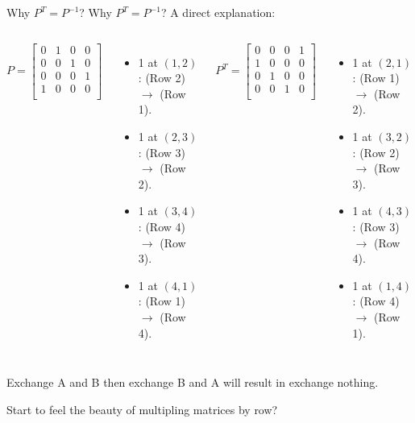 \documentclass{beamer}
\begin{document}
\begin{frame}{Why $P^T=P^{-1}$?}
Why $P^T=P^{-1}$? A direct explanation:
\vspace{3pt}

\begin{columns}
\begin{equation*}
    P=\left[ \begin{matrix}
        0&		1&		0&		0\\
        0&		0&		1&		0\\
        0&		0&		0&		1\\
        1&		0&		0&		0\\
    \end{matrix} \right]
\end{equation*}

\begin{itemize}
    \item 1 at $(1,2)$: (Row 2) $\rightarrow$ (Row 1).
    \item 1 at $(2,3)$: (Row 3) $\rightarrow$ (Row 2).
    \item 1 at $(3,4)$: (Row 4) $\rightarrow$ (Row 3).
    \item 1 at $(4,1)$: (Row 1) $\rightarrow$ (Row 4).
\end{itemize}

\begin{equation*}
    P^T=\left[ \begin{matrix}
        0&		0&		0&		1\\
        1&		0&		0&		0\\
        0&		1&		0&		0\\
        0&		0&		1&		0\\
    \end{matrix} \right]
\end{equation*}

\begin{itemize}
    \item 1 at $(2,1)$: (Row 1) $\rightarrow$ (Row 2).
    \item 1 at $(3,2)$: (Row 2) $\rightarrow$ (Row 3).
    \item 1 at $(4,3)$: (Row 3) $\rightarrow$ (Row 4).
    \item 1 at $(1,4)$: (Row 4) $\rightarrow$ (Row 1).
\end{itemize}
\end{columns}

\vspace{7pt}
Exchange A and B then exchange B and A will result in exchange nothing.

\vspace{3pt}
Start to feel the beauty of multipling matrices by row?
\end{frame}
\end{document}
